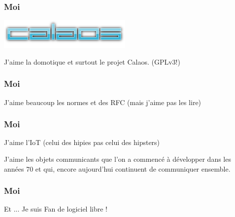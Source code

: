 \documentclass{smilebeamer}
\begin{document}
{
%
\begin{frame}
\end{frame}
}

\begin{frame}
\frametitle{Moi}

\includegraphics{img/calaos_about_logo.png}
\begin{center}
J'aime la domotique et surtout le projet Calaos. (GPLv3!)
\end{center}
\end{frame}

\begin{frame}
\frametitle{Moi}
\begin{center}
J'aime beaucoup les normes et des RFC
\newline 
(mais j'aime pas les lire)
\end{center}
\end{frame}

\begin{frame}
\frametitle{Moi}
\begin{center}
J'aime l'IoT (celui des hipies pas celui des hipsters)
\end{center}

J'aime les objets communicants que l'on a commencé à développer dans
les années 70 et qui, encore aujourd'hui continuent de communiquer
ensemble.
\end{frame}


\begin{frame}
\frametitle{Moi}
\begin{center}
Et ... Je suis Fan de logiciel libre !
\end{center}
\end{frame}
\end{document}
